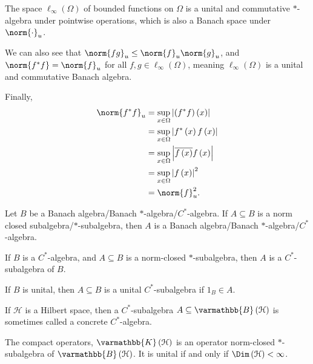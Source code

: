 \documentclass[10pt]{mypackage}
\renewcommand*{\mathbb}[1]{\varmathbb{#1}}
\newcommand{\B}{\mathbb{B}}
\begin{document}
\begin{example}
  The space $\ell_{\infty}\left(\Omega\right)$ of bounded functions on $\Omega$ is a unital and commutative $\ast$-algebra under pointwise operations, which is also a Banach space under $\norm{\cdot}_{u}$.\newline

  We can also see that $\norm{fg}_{u} \leq \norm{f}_{u}\norm{g}_{u}$, and $\norm{f^{\ast}f}= \norm{f}_u$ for all $f,g\in \ell_{\infty}\left(\Omega\right)$, meaning $\ell_{\infty}\left(\Omega\right)$ is a unital and commutative Banach algebra.\newline

  Finally,
  \begin{align*}
    \norm{f^{\ast}f}_{u} &= \sup_{x\in \Omega}\left\vert \left(f^{\ast}f\right)\left(x\right) \right\vert\\
                         &= \sup_{x\in \Omega}\left\vert f^{\ast}\left(x\right)f\left(x\right) \right\vert\\
                         &= \sup_{x\in \Omega}\left\vert \overline{f\left(x\right)} f\left(x\right)\right\vert\\
                         &= \sup_{x\in \Omega}\left\vert f\left(x\right) \right\vert^2\\
                         &= \norm{f}^2_u.
  \end{align*}
\end{example}
\begin{lemma}
  Let $B$ be a Banach algebra/Banach $\ast$-algebra/$C^{\ast}$-algebra. If $A\subseteq B$ is a norm closed subalgebra/$\ast$-subalgebra, then $A$ is a Banach algebra/Banach $\ast$-algebra/$C^{\ast}$-algebra.
\end{lemma}
\begin{definition}
  If $B$ is a $C^{\ast}$-algebra, and $A\subseteq B$ is a norm-closed $\ast$-subalgebra, then $A$ is a $C^{\ast}$-subalgebra of $B$.\newline

  If $B$ is unital, then $A\subseteq B$ is a unital $C^{\ast}$-subalgebra if $1_B\in A$.\newline

  If $\mathcal{H}$ is a Hilbert space, then a $C^{\ast}$-subalgebra $A\subseteq \B\left(\mathcal{H}\right)$ is sometimes called a concrete $C^{\ast}$-algebra.
\end{definition}
\begin{example}
  The compact operators, $\mathbb{K}\left(\mathcal{H}\right)$ is an operator norm-closed $\ast$-subalgebra of $\B\left(\mathcal{H}\right)$. It is unital if and only if $\Dim\left(\mathcal{H}\right) < \infty$.
\end{example}
\end{document}
